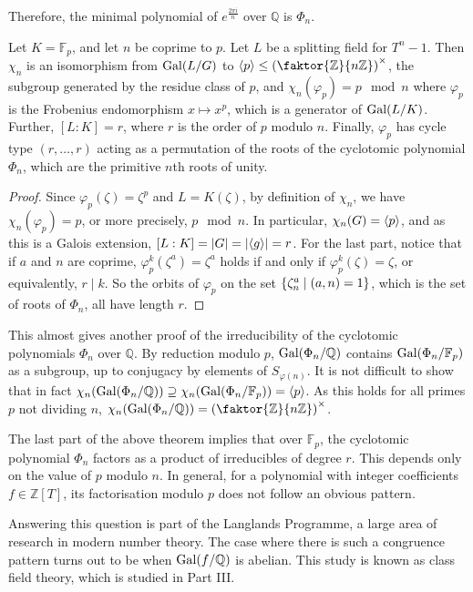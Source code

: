 Therefore, the minimal polynomial of \( e^{\frac{2\pi i}{n}} \) over \( \mathbb Q \) is \( \Phi_n \).
\begin{theorem}
	Let \( K = \mathbb F_p \), and let \( n \) be coprime to \( p \).
	Let \( L \) be a splitting field for \( T^n - 1 \).
	Then \( \chi_n \) is an isomorphism from \( \operatorname{Gal}(L/G) \) to \( \genset{p} \leq \qty(\faktor{\mathbb Z}{n\mathbb Z})^\times \), the subgroup generated by the residue class of \( p \), and \( \chi_n(\varphi_p) = p \mod n \) where \( \varphi_p \) is the Frobenius endomorphism \( x \mapsto x^p \), which is a generator of \( \operatorname{Gal}(L/K) \).
	Further, \( [L:K] = r \), where \( r \) is the order of \( p \) modulo \( n \).
	Finally, \( \varphi_p \) has cycle type \( (r,\dots,r) \) acting as a permutation of the roots of the cyclotomic polynomial \( \Phi_n \), which are the primitive \( n \)th roots of unity.
\end{theorem}
\begin{proof}
	Since \( \varphi_p(\zeta) = \zeta^p \) and \( L = K(\zeta) \), by definition of \( \chi_n \), we have \( \chi_n(\varphi_p) = p \), or more precisely, \( p \mod n \).
	In particular, \( \chi_n(G) = \left\langle{} p \right\rangle \), and as this is a Galois extension, \( [L:K] = \abs{G} = \abs{\left\langle{} g \right\rangle} = r \).
	For the last part, notice that if \( a \) and \( n \) are coprime, \( \varphi_p^k(\zeta^a) = \zeta^a \) holds if and only if \( \varphi_p^k(\zeta) = \zeta \), or equivalently, \( r \mid k \).
	So the orbits of \( \varphi_p \) on the set \( \qty{\zeta_n^a \mid (a,n) = 1} \), which is the set of roots of \( \Phi_n \), all have length \( r \).
\end{proof}
\begin{remark}
	This almost gives another proof of the irreducibility of the cyclotomic polynomials \( \Phi_n \) over \( \mathbb Q \).
	By reduction modulo \( p \), \( \operatorname{Gal}(\Phi_n/\mathbb Q) \) contains \( \operatorname{Gal}(\Phi_n/\mathbb F_p) \) as a subgroup, up to conjugacy by elements of \( S_{\varphi(n)} \).
	It is not difficult to show that in fact \( \chi_n(\operatorname{Gal}(\Phi_n/\mathbb Q)) \supseteq \chi_n(\operatorname{Gal}(\Phi_n/\mathbb F_p)) = \left\langle{} p \right\rangle \).
	As this holds for all primes \( p \) not dividing \( n \), \( \chi_n(\Gal(\Phi_n/\mathbb Q)) = \qty(\faktor{\mathbb Z}{n\mathbb Z})^\times \).
\end{remark}
\begin{remark}
	The last part of the above theorem implies that over \( \mathbb F_p \), the cyclotomic polynomial \( \Phi_n \) factors as a product of irreducibles of degree \( r \).
	This depends only on the value of \( p \) modulo \( n \).
	In general, for a polynomial with integer coefficients \( f \in \mathbb Z[T] \), its factorisation modulo \( p \) does not follow an obvious pattern.

	Answering this question is part of the Langlands Programme, a large area of research in modern number theory.
	The case where there is such a congruence pattern turns out to be when \( \operatorname{Gal}(f/\mathbb Q) \) is abelian.
	This study is known as class field theory, which is studied in Part III.
\end{remark}

